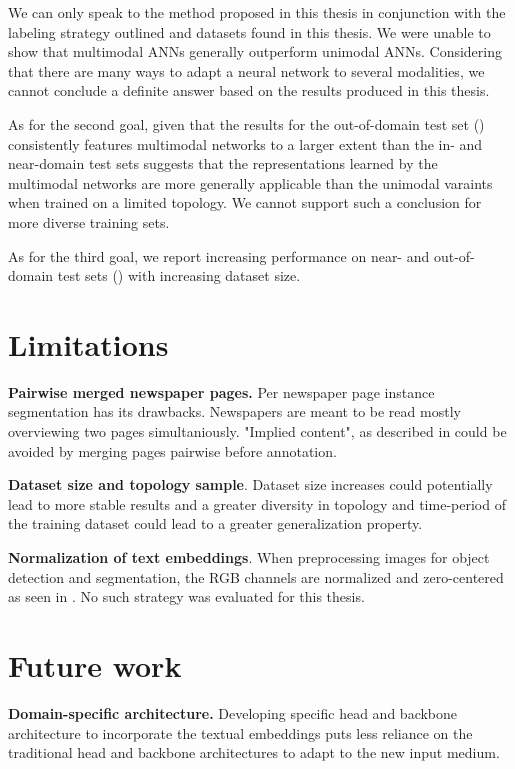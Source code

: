 \documentclass[oneside, english, bibtex]{kththesis}
\begin{document}
We can only speak to the method proposed in this thesis in conjunction with the labeling strategy outlined and datasets found in this thesis. We were unable to show that multimodal ANNs generally outperform unimodal ANNs. Considering that there are many ways to adapt a neural network to several modalities, we cannot conclude a definite answer based on the results produced in this thesis. 

As for the second goal, given that the results for the out-of-domain test set () consistently features multimodal networks to a larger extent than the in- and near-domain test sets suggests that the representations learned by the multimodal networks are more generally applicable than the unimodal varaints when trained on a limited topology. We cannot support such a conclusion for more diverse training sets.

As for the third goal, we report increasing performance on near- and out-of-domain test sets () with increasing dataset size. 

\section{Limitations}

\textbf{Pairwise merged newspaper pages.} Per newspaper page instance segmentation has its drawbacks. Newspapers are meant to be read mostly overviewing two pages simultaniously. "Implied content", as described in  could be avoided by merging pages pairwise before annotation.


\textbf{Dataset size and topology sample}. Dataset size increases could potentially lead to more stable results and a greater diversity in topology and time-period of the training dataset could lead to a greater generalization property.


\textbf{Normalization of text embeddings}. When preprocessing images for object detection and segmentation, the RGB channels are normalized and zero-centered as seen in . No such strategy was evaluated for this thesis.

\section{Future work}

\textbf{Domain-specific architecture.} Developing specific head and backbone architecture to incorporate the textual embeddings puts less reliance on the traditional head and backbone architectures to adapt to the new input medium.
\end{document}

